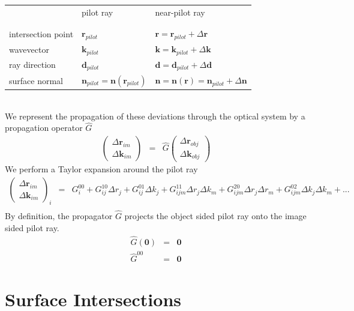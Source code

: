 \documentclass[12pt,a4paper,twoside,openright,BCOR10mm,headsepline,titlepage,abstracton,chapterprefix,final]{scrreprt}
\newcommand\Vector[1]{{\mathbf{#1}}}
\newcommand\wavenumber{k}
\newcommand\Wavevector{\Vector{\wavenumber}}
\begin{document}
\begin{tabular}{ l | l | l }
		    & pilot ray & near-pilot ray \\
& & \\ \hline & & \\
intersection point  & $\Vector{r}_{pilot}$ & ${\Vector{r}} = \Vector{r}_{pilot} + \Delta\Vector{r}$ \\
wavevector  & $\Wavevector_{pilot}$ & ${\Wavevector} = \Wavevector_{pilot} + \Delta\Wavevector$ \\
ray direction  & $\Vector{d}_{pilot}$ & ${\Vector{d}} = \Vector{d}_{pilot} + \Delta\Vector{d}$ \\
surface normal      & $\Vector{n}_{pilot} = \Vector{n}(\Vector{r}_{pilot})$ & ${\Vector{n}} = \Vector{n}({\Vector{r}}) = \Vector{n}_{pilot} + \Delta\Vector{n}$ \\
\end{tabular}\\[2ex]
We represent the propagation of these deviations through the optical system by a propagation operator $\hat{G}$
\begin{eqnarray}
 \begin{pmatrix}
  \Delta \Vector{r}_{im} \\ \Delta \Wavevector_{im}
 \end{pmatrix}
 &=&
 \hat{G}
 \begin{pmatrix}
  \Delta \Vector{r}_{obj} \\ \Delta \Wavevector_{obj}
 \end{pmatrix}
\end{eqnarray}
We perform a Taylor expansion around the pilot ray
\begin{eqnarray}
 \begin{pmatrix}
  \Delta \Vector{r}_{im} \\ \Delta \Wavevector_{im}
 \end{pmatrix}_i
 &=&
   G^{00}_i
 + G^{10}_{ij} \Delta r_j
 + G^{01}_{ij} \Delta k_j
 + G^{11}_{ijm} \Delta r_j \Delta k_m
 + G^{20}_{ijm} \Delta r_j \Delta r_m
 + G^{02}_{ijm} \Delta k_j \Delta k_m
 + ...\nonumber\\
\end{eqnarray}
By definition, the propagator $\hat{G}$ projects the object sided pilot ray onto the image sided pilot ray.
\begin{eqnarray}
\hat{G}(\Vector{0}) &=& \Vector{0}\\
\hat{G}^{00} &=& \Vector{0} 
\end{eqnarray}

\chapter{Surface Intersections}\label{subsec:intersectionformulas}
\end{document}
